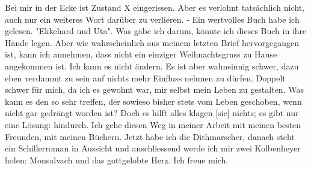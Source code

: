 \def\day{18. Februar 1943}
\mktitle

Bei mir in der Ecke ist Zustand X eingerissen.
Aber es verlohnt tats\"{a}chlich nicht, auch nur ein weiteres Wort dar\"{u}ber zu verlieren.
- Ein wertvolles Buch habe ich gelesen.
"Ekkehard und Uta".
Was g\"{a}be ich darum, k\"{o}nnte ich dieses Buch in ihre H\"{a}nde legen.
Aber wie wahrscheinlich aus meinem letzten Brief hervorgegangen ist, kann ich annehmen, dass nicht ein einziger Weihnachtsgruss zu Hause angekommen ist.
Ich kann es nicht \"{a}ndern.
Es ist aber wahnsinnig schwer, dazu eben verdammt zu sein auf nichts mehr Einfluss nehmen zu d\"{u}rfen.
Doppelt schwer f\"{u}r mich, da ich es gewohnt war, mir selbst mein Leben zu gestalten.
Was kann es den so sehr treffen, der sowieso bisher stets vom Leben geschoben, wenn nicht gar gedr\"{a}ngt worden ist?
Doch es hilft alles klagen{\color{red} [sic] } nichts; es gibt nur eine L\"{o}sung: hindurch.
Ich gehe diesen Weg in meiner Arbeit mit meinen besten Freunden, mit meinen B\"{u}chern.
Jetzt habe ich die Dithmarscher, danach steht ein Schillerroman in Aussicht und anschliessend werde ich mir zwei Kolbenheyer holen: Monsalvach und das gottgelobte Herz.
Ich freue mich.

\clearpage
